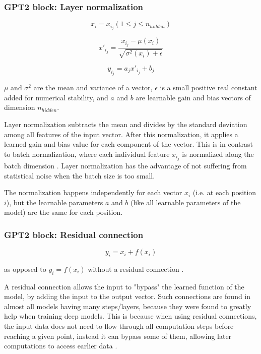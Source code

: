 \subsubsection{GPT2 block: Layer normalization}


$$x_i = x_{i_j} (1 \leq j \leq n_{hidden})$$

$$x'_{i_j} = \frac {x_{i_j} - \mu(x_i)} {\sqrt {\sigma^2(x_i)+\epsilon}} $$

$$y_{i_j} = a_j x'_{i_j} + b_j$$

$\mu$ and $\sigma^2$ are the mean and variance of a vector, $\epsilon$ is a small positive real constant added for numerical stability, and $a$ and $b$ are learnable gain and bias vectors of dimension $n_{hidden}$.

Layer normalization subtracts the mean and divides by the standard deviation among all features of the input vector.
After this normalization, it applies a learned gain and bias value for each component of the vector.
This is in contrast to batch normalization, where each individual feature $x_{i_j}$ is normalized along the batch dimension .
Layer normalization has the advantage of not suffering from statistical noise when the batch size is too small.

The normalization happens independently for each vector $x_i$ (i.e. at each position $i$), but the learnable parameters $a$ and $b$ (like all learnable parameters of the model) are the same for each position.

\subsubsection{GPT2 block: Residual connection}

\begin{samepage}

$$y_i = x_i + f(x_i)$$

as opposed to $y_i = f(x_i)$ without a residual connection \cite[p. 3]{allyouneed} \cite{residual}.

A residual connection allows the input to "bypass" the learned function of the model, by adding the input to the output vector.
Such connections are found in almost all models having many steps/layers, because they were found to greatly help when training deep models.
This is because when using residual connections, the input data does not need to flow through all computation steps before reaching a given point, instead it can bypass some of them, allowing later computations to access earlier data .

\end{samepage}

